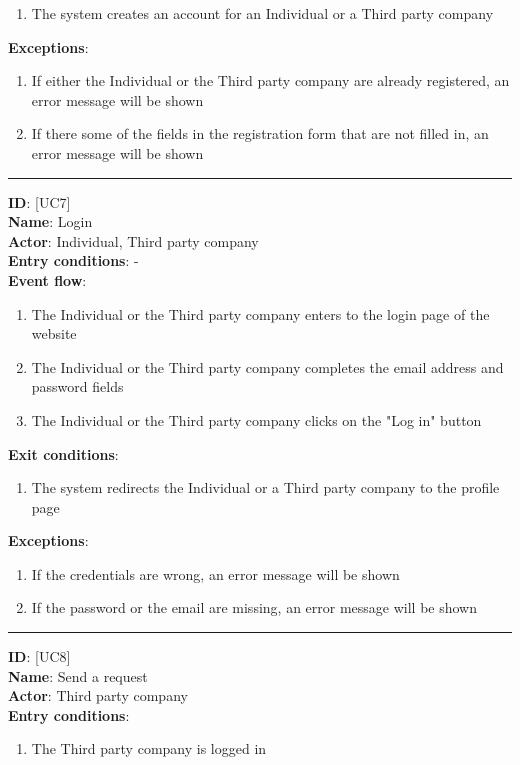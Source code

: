 \documentclass[12pt]{article}
\newcommand\usecase[1]{ [UC#1] }
\begin{document}
\begin{itemize}
\begin{enumerate}
    			\item{The system creates an account for an Individual or a Third party company}
  		\end{enumerate}
  	\textbf{Exceptions}: 
  		\begin{enumerate}
    			\item{If either the Individual or the Third party company are already registered, an error message will be shown}
    			\item{If there some of the fields in the registration form that are not filled in, an error message will be shown}
  		\end{enumerate}
  	\rule{\linewidth}{0.4pt}
  	\textbf{ID}: \usecase{7} \\
  	\textbf{Name}: Login \\
    \textbf{Actor}: Individual, Third party company \\
    \textbf{Entry conditions}: - \\
  	\textbf{Event flow}:
  		\begin{enumerate}
    			\item{The Individual or the Third party company enters to the login page of the website}
    			\item{The Individual or the Third party company completes the email address and password fields}
    			\item{The Individual or the Third party company clicks on the "Log in" button}
  		\end{enumerate}
  	\textbf{Exit conditions}:
  		\begin{enumerate}
    			\item{The system redirects the Individual or a Third party company to the profile page}
  		\end{enumerate}
  	\textbf{Exceptions}: 
  		\begin{enumerate}
    			\item{If the credentials are wrong, an error message will be shown}
    			\item{If the password or the email are missing, an error message will be shown}
  		\end{enumerate}
  	\rule{\linewidth}{0.4pt}
  	\textbf{ID}: \usecase{8} \\
  	\textbf{Name}: Send a request \\
    \textbf{Actor}: Third party company \\
    \textbf{Entry conditions}:
    		\begin{enumerate}
    			\item{The Third party company is logged in}

\end{enumerate}
\end{itemize}
\end{document}
